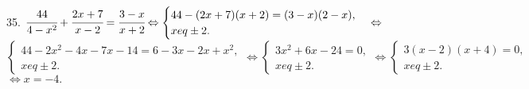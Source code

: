 35. $\cfrac{44}{4-x^2}+\cfrac{2x+7}{x-2}=\cfrac{3-x}{x+2}\Leftrightarrow \begin{cases}44-(2x+7)(x+2)=(3-x)(2-x),\\ x
eq\pm2.\end{cases}
\Leftrightarrow$\\$ \begin{cases}44-2x^2-4x-7x-14=6-3x-2x+x^2,\\ x
eq\pm2.\end{cases}
\Leftrightarrow \begin{cases}3x^2+6x-24=0,\\ x
eq\pm2.\end{cases}
\Leftrightarrow \begin{cases}3(x-2)(x+4)=0,\\ x
eq\pm2.\end{cases}$\\$\Leftrightarrow x=-4.$\\

